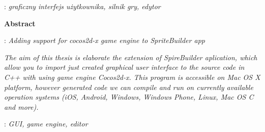 \begin{titlepage}
    : {\itshape graficzny interfejs użytkownika, silnik gry, edytor}
    \par
    \vspace{4\baselineskip}
    \begin{center}
	{\large\bfseries Abstract}\par\bigskip
    \end{center}
    : {\itshape Adding support for cocos2d-x game engine to SpriteBuilder app}\par
    \vspace*{1\baselineskip}
    {\itshape
    The aim of this thesis is elaborate the extension of SpireBuilder aplication, which allow you to import just created graphical user interface to the source code in C++ with using game engine Cocos2d-x. This program is accessible on Mac OS X platform, however generated code we can compile and run on currently available operation systems (iOS, Android, Windows, Windows Phone, Linux, Mac OS C and more).
    }
    \vspace*{1\baselineskip}

    : {\itshape GUI, game engine, editor}

\end{titlepage}

